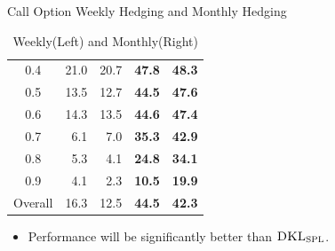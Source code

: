 \documentclass[10pt,table,mathserif]{beamer}
\newcommand{\DKLs}{\bf\textsc{DKL}_{\text{SPL}}}
\begin{document}
\begin{frame}[fragile]{Call Option Weekly Hedging and Monthly Hedging}
\begin{table}[htp!]
{\begin{tabular}{|c|r r r r|}
  0.4          &21.0    & 20.7 &\textbf{47.8} &\textbf{48.3}\\
  0.5          &13.5    & 12.7 &\textbf{44.5} &\textbf{47.6}\\
  0.6          &14.3    & 13.5 &\textbf{44.6} &\textbf{47.4}\\
  0.7          &6.1     & 7.0  &\textbf{35.3} &\textbf{42.9}\\
  0.8          &5.3     & 4.1  &\textbf{24.8} &\textbf{34.1}\\
  0.9          &4.1     & 2.3  &\textbf{10.5} &\textbf{19.9}\\
  Overall      &16.3    & 12.5 &\textbf{44.5} &\textbf{42.3} \\
  \hline
\end{tabular}
}\caption{Weekly(Left) and Monthly(Right)}
\end{table}
\begin{itemize}
  \item Performance will be significantly better than $\DKLs$.
\end{itemize}
\end{frame}
\end{document}

